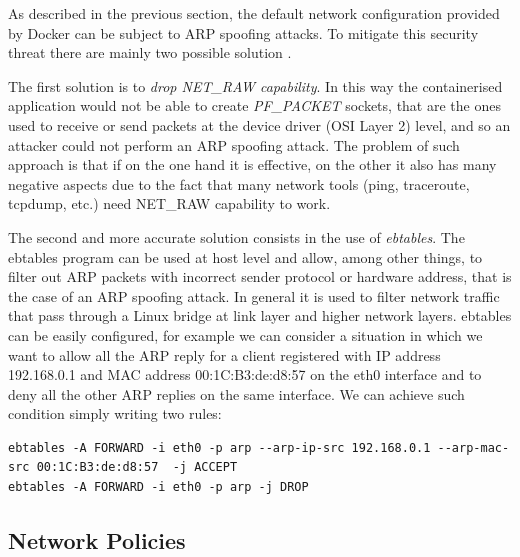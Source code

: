 \documentclass[a4paper,12pt]{article}
\begin{document}
As described in the previous section, the default network configuration provided
by Docker can be subject to ARP spoofing attacks. To mitigate this security
threat there are mainly two possible solution \cite{nyantec_network_docker}.
\par The first solution is to \textit{drop NET\_RAW capability}. In this way the
containerised application would not be able to create \textit{PF\_PACKET}
sockets, that are the ones used to receive or send packets at the device driver
(OSI Layer 2) level, and so an attacker could not perform an ARP spoofing
attack. The problem of such approach is that if on the one hand it is effective,
on the other it also has many negative aspects due to the fact that many network
tools (ping, traceroute, tcpdump, etc.) need NET\_RAW capability to work. \par
The second and more accurate solution consists in the use of \textit{ebtables}.
The ebtables program can be used at host level and allow, among other things, to
filter out ARP packets with incorrect sender protocol or hardware address, that
is the case of an ARP spoofing attack. In general it is used to filter network
traffic that pass through a Linux bridge at link layer and higher network
layers. ebtables can be easily configured, for example we can consider a
situation in which we want to allow all the ARP reply for a client registered
with IP address 192.168.0.1 and MAC address 00:1C:B3:de:d8:57 on the eth0 interface and
to deny all the other ARP replies on the same interface. We can achieve such
condition simply writing two rules:
\begin{lstlisting}
ebtables -A FORWARD -i eth0 -p arp --arp-ip-src 192.168.0.1 --arp-mac-src 00:1C:B3:de:d8:57  -j ACCEPT
ebtables -A FORWARD -i eth0 -p arp -j DROP
\end{lstlisting}

\subsection{Network Policies}
\end{document}
